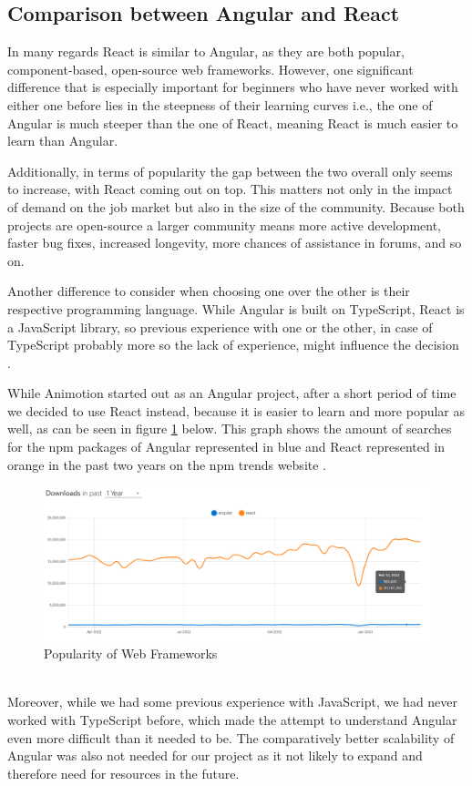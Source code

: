\subsection{Comparison between Angular and React}
In many regards React is similar to Angular, as they are both popular, component-based, open-source web frameworks. However, one 
significant difference that is especially important for beginners who have never worked with either one before lies in the 
steepness of their learning curves i.e., the one of Angular is much steeper than the one of React, meaning React is much easier 
to learn than Angular.

Additionally, in terms of popularity the gap between the two overall only seems to increase, with React coming out on top. This 
matters not only in the impact of demand on the job market but also in the size of the community. Because both projects are 
open-source a larger community means more active development, faster bug fixes, increased longevity, more chances of assistance 
in forums, and so on.

Another difference to consider when choosing one over the other is their respective programming language. While Angular is built
on TypeScript, React is a JavaScript library, so previous experience with one or the other, in case of TypeScript probably
more so the lack of experience, might influence the decision \cite{AngularReactComparison}.

While Animotion started out as an Angular project, after a short period of time we decided to use React instead, because it 
is easier to learn and more popular as well, as can be seen in figure \ref{fig:webpop} below. This graph shows the amount of 
searches for the npm packages of Angular represented in blue and React represented in orange in the past two years on
the npm trends website \cite{AngularReactPopularity}.
\\
\begin{figure}[htb]
  \centering
  \includegraphics[width=1\textwidth]{pics/WebframeworkPopularity.png}
  \caption{Popularity of Web Frameworks}
  \label{fig:webpop}
\end{figure}
\\
Moreover, while we had some previous experience with JavaScript, we had never worked with TypeScript before, which made the attempt 
to understand Angular even more difficult than it needed to be. The comparatively better scalability of Angular was also not needed
for our project as it not likely to expand and therefore need for resources in the future.

